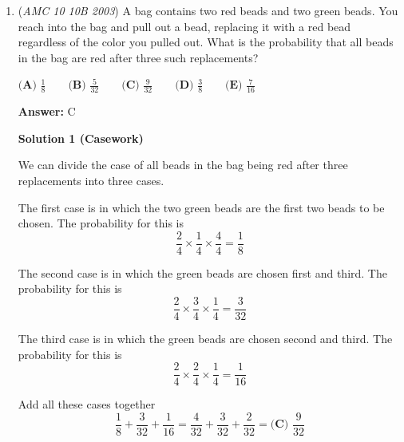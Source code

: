 \begin{enumerate}
 We can let the area of triangle $EFG$ equal $x$, which means the area of triangle $EAB$ is $x + 10.5$. Since we know the scale factor for the linear measures of the triangles is $2:5$, the ratio of their areas must be $k^2$. In other words, the ratio of the area of $\triangle EFG$ to the area of $\triangle EAB$ is $2^2: 5^2$, or $4:25$. 

 Now we can set up an equation to solve for $x$:
 \[\frac{25}{4}x = x + 10.5\]

 Subtracting $x$ from both sides gives:
 \[\frac{21}{4}x = 10.5\]

 Solving this equation, we get $x = 2$, meaning the area of $\triangle EFG$ is $2$. This means that the area of triangle $EAB$ is $10.5 + 2 = 12.5$, which corresponds to answer choice $\text{(D)}\ \boxed{\frac{25}{2}}$.

 -jpudi

 


	\item (\textit{AMC 10 10B 2003}) A bag contains two red beads and two green beads. You reach into the bag and pull out a bead, replacing it with a red bead regardless of the color you pulled out. What is the probability that all beads in the bag are red after three such replacements?


 $\textbf{(A) } \frac{1}{8} \qquad\textbf{(B) } \frac{5}{32} \qquad\textbf{(C) } \frac{9}{32} \qquad\textbf{(D) } \frac{3}{8} \qquad\textbf{(E) } \frac{7}{16}$

 \textbf{Answer: }C



\textbf{Solution 1 (Casework)}

We can divide the case of all beads in the bag being red after three replacements into three cases. 

 The first case is in which the two green beads are the first two beads to be chosen. The probability for this is
 \[\frac{2}{4} \times \frac{1}{4} \times \frac{4}{4} = \frac{1}{8}\] 

 The second case is in which the green beads are chosen first and third. The probability for this is
 \[\frac{2}{4} \times \frac{3}{4} \times \frac{1}{4} = \frac{3}{32}\]

 The third case is in which the green beads are chosen second and third. The probability for this is
 \[\frac{2}{4} \times \frac{2}{4} \times \frac{1}{4} = \frac{1}{16}\]

 Add all these cases together
 \[\frac{1}{8}+\frac{3}{32}+\frac{1}{16} = \frac{4}{32}+\frac{3}{32}+\frac{2}{32} = \boxed{\textbf{(C) \ } \frac{9}{32}}\]





\end{enumerate}
